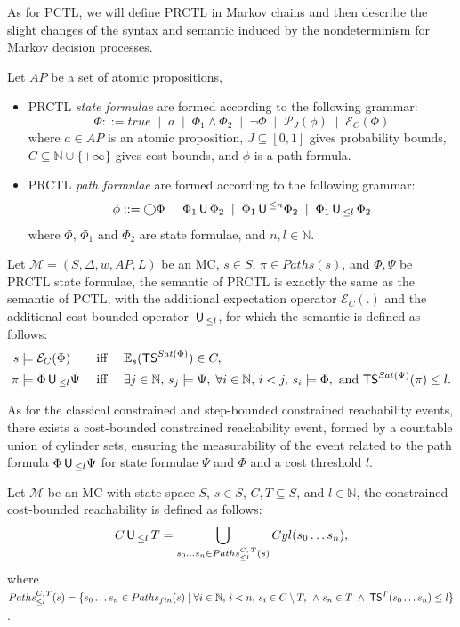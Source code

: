 As for PCTL, we will define PRCTL in Markov chains and then describe the slight changes of the syntax and semantic induced by the nondeterminism for Markov decision processes.


\begin{definition}
Let $AP$ be a set of atomic propositions,
\begin{itemize}
  \item PRCTL \textit{state formulae} are formed according to the following grammar:
  \[
    \Phi ::= true \;\; | \;\; a \;\; | \;\; \Phi_1 \wedge \Phi_2 \;\; | \;\; \neg \Phi \;\; | \;\; \mathcal{P}_J(\phi) \;\; | \;\; \mathcal{E}_C(\Phi)
  \]
  where $a \in AP$ is an atomic proposition, $J \subseteq [0, 1]$ gives probability bounds, $C \subseteq \mathbb{N} \cup \{+\infty\}$ gives cost bounds, and $\phi$ is a path formula.
  \item PRCTL \textit{path formulae} are formed according to the following grammar:
  \[
  \phi ::= \bigcirc \Phi \;\; | \;\; \Phi_1 \,\text{\sffamily U}\, \Phi_2 \;\; | \;\; \Phi_1 \,\text{\sffamily U}\,^{\leq n} \Phi_2
  \;\; | \;\; \Phi_1 \,\text{\sffamily U}\,_{\leq l}\, \Phi_2
  \]
  where $\Phi$, $\Phi_1$ and $\Phi_2$ are state formulae, and $n, l \in \mathbb{N}$.
\end{itemize}
\end{definition}
\begin{definition}
  Let $\mathcal{M} = (S, \Delta, w, AP, L)$ be an MC, $s \in S$, $\pi \in Paths(s)$, and $\Phi, \Psi$ be PRCTL state formulae, the semantic of PRCTL is exactly the same as the semantic of PCTL, with the additional expectation operator $\mathcal{E}_C(.)$ and the additional cost bounded operator $\,\text{\sffamily U}\,_{\leq l}$, for which the semantic is defined as follows:
  \begin{align*}
  s &\models \mathcal{E}_C(\Phi) &\text{ iff }\quad& \mathbb{E}_s(\text{\sffamily TS}^{Sat(\Phi)}) \in C,\\
  \pi &\models \Phi \,\text{\sffamily U}\,_{\leq l} \Psi &\text{ iff }\quad&
  \exists j \in \mathbb{N}, \, s_j \models \Psi, \; \forall i \in \mathbb{N}, \, i<j, \, s_i \models \Phi,
  \text{ and } \text{\sffamily TS}^{Sat(\Psi)}(\pi) \leq l.
  \end{align*}
\end{definition}
As for the classical constrained and
step-bounded constrained reachability events, there
exists a cost-bounded constrained reachability event, formed by a countable union of cylinder sets, ensuring the measurability of the event related to the path formula $\Phi \,\text{\sffamily U}\,_{\leq l} \Psi$ for state formulae $\Psi$ and $\Phi$ and a cost threshold $l$.
\begin{definition}
  Let $\mathcal{M}$ be an MC with state space $S$, $s \in S$, $C, T \subseteq S$, and $l \in \mathbb{N}$, the constrained cost-bounded reachability is defined as follows:
    \[C \,\text{\sffamily U}\,_{\leq l}\, T = \bigcup_{s_0 \dots s_n \in Paths^{C, \, T}_{\leq l}(s)} Cyl(s_0 \dots s_n),
  \]
  where
  $
    Paths^{C, \,  T}_{\leq l}(s)= \{ s_0 \dots s_n \in Paths_{fin}(s) \; | \; \forall i \in \mathbb{N}, \, i<n, \, s_i \in C \setminus T,\,   \; \wedge \; s_n \in T \; \wedge \; \text{\sffamily TS}^T(s_0\dots s_n) \leq l \}$.
\end{definition}

